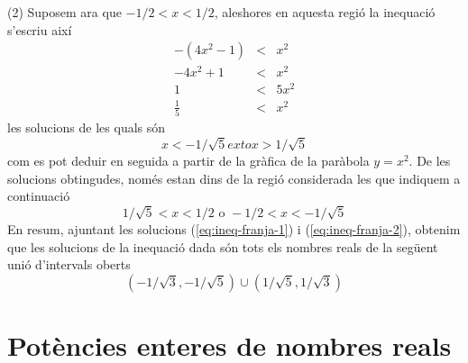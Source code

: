 \begin{solucio}
(2) Suposem ara que $-1/2<x<1/2$, aleshores en aquesta regió la
inequació s’escriu així%
\begin{align*}
-(4x^{2}-1) &<&x^{2} \\
-4x^{2}+1 &<&x^{2} \\
1 &<&5x^{2} \\
\frac{1}{5} &<&x^{2}
\end{align*}%
les solucions de les quals són%
\begin{equation*}
x<-1/\sqrt{5}	ext{ o }x>1/\sqrt{5}
\end{equation*}%
com es pot deduir en seguida a partir de la gràfica de la paràbola $y=x^{2}$. De les solucions obtingudes, només estan dins de la
regió considerada les que indiquem a continuació%
\begin{equation}
1/\sqrt{5}<x<1/2\text{ \ \ \ \ o \ \ \ }-1/2<x<-1/\sqrt{5}  \label{eq:ineq-franja-2}
\end{equation}%
En resum, ajuntant les solucions (\ref{eq:ineq-franja-1}) i (\ref{eq:ineq-franja-2}), obtenim que
les solucions de la inequació dada són tots els nombres reals de
la següent unió d’intervals oberts%
\begin{equation*}
\left( -1/\sqrt{3},-1/\sqrt{5}\right) \cup \left( 1/\sqrt{5},1/\sqrt{3}%
\right)
\end{equation*}
\end{solucio}

\section{Potències enteres de nombres reals}

